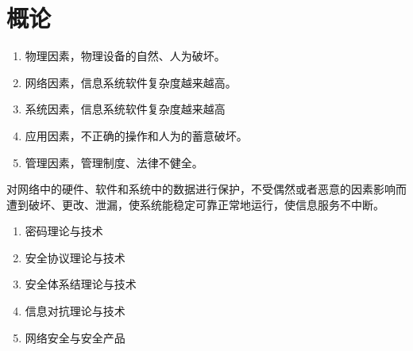 \chapter{概论}
\vspace{-5em}
\noindent{}
\begin{enumerate}
	\item 物理因素，物理设备的自然、人为破坏。
	\item 网络因素，信息系统软件复杂度越来越高。
	\item 系统因素，信息系统软件复杂度越来越高
	\item 应用因素，不正确的操作和人为的蓄意破坏。
	\item 管理因素，管理制度、法律不健全。
\end{enumerate}
对网络中的硬件、软件和系统中的数据进行保护，不受偶然或者恶意的因素影响而遭到破坏、更改、泄漏，使系统能稳定可靠正常地运行，使信息服务不中断。

\begin{enumerate}
	\item 密码理论与技术
	\item 安全协议理论与技术
	\item 安全体系结理论与技术
	\item 信息对抗理论与技术
	\item 网络安全与安全产品
\end{enumerate}

